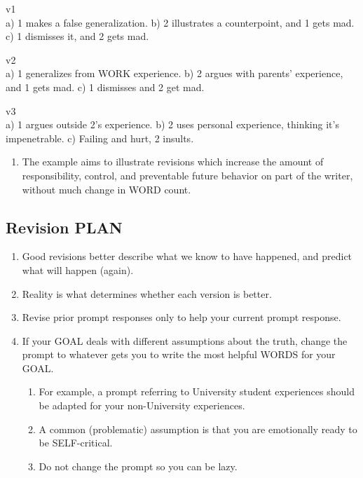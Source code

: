 \documentclass[
]{book}
\providecommand{\tightlist}{%
  \setlength{\itemsep}{0pt}\setlength{\parskip}{0pt}}
\begin{document}
v1\\
a) 1 makes a false generalization.
b) 2 illustrates a counterpoint, and 1 gets mad.
c) 1 dismisses it, and 2 gets mad.

v2\\
a) 1 generalizes from WORK experience.
b) 2 argues with parents' experience, and 1 gets mad.
c) 1 dismisses and 2 get mad.

v3\\
a) 1 argues outside 2's experience.
b) 2 uses personal experience, thinking it's impenetrable.
c) Failing and hurt, 2 insults.

\begin{enumerate}
\def\labelenumi{\arabic{enumi}.}
\setcounter{enumi}{27}
\tightlist
\item
  The example aims to illustrate revisions which increase the amount of
  responsibility, control, and preventable future behavior on part of the
  writer, without much change in WORD count.
\end{enumerate}

\hypertarget{revision-plan}{%
\subsection{Revision PLAN}\label{revision-plan}}

\begin{enumerate}
\def\labelenumi{\arabic{enumi}.}
\setcounter{enumi}{28}
\tightlist
\item
  Good revisions better describe what we know to have happened, and
  predict what will happen (again).
\item
  Reality is what determines whether each version is better.
\item
  Revise prior prompt responses only to help your current prompt
  response.
\item
  If your GOAL deals with different assumptions about the truth, change
  the prompt to whatever gets you to write the most helpful WORDS for your GOAL.

  \begin{enumerate}
  \def\labelenumii{\arabic{enumii}.}
  \tightlist
  \item
    For example, a prompt referring to University student
    experiences should be adapted for your non-University
    experiences.
  \item
    A common (problematic) assumption is that you are emotionally
    ready to be SELF-critical.
  \item
    Do not change the prompt so you can be lazy.
  \end{enumerate}
\end{enumerate}
\end{document}
